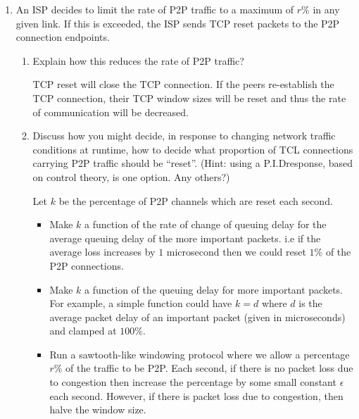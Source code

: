 \documentclass[10pt,\jkfside,a4paper]{article}
\begin{document}
\begin{enumerate}

    \item An ISP decides to limit the rate of P2P traffic to a maximum of $r\%$ in any given link. If this is exceeded, the ISP sends TCP reset packets to the P2P connection endpoints.

    \begin{enumerate}

        \item Explain how this reduces the rate of P2P traffic?

        TCP reset will close the TCP connection. If the peers re-establish the TCP connection, their TCP window sizes will be reset and thus the rate of communication will be decreased.

        \item Discuss how you might decide, in response to changing network traffic conditions at runtime, how to decide what proportion of TCL connections carrying P2P traffic should be ``reset''.
        (Hint: using a P.I.D\onedot response, based on control theory, is one option. Any others?)

        Let $k$ be the percentage of P2P channels which are reset each second.

        \begin{itemize}

            \item Make $k$ a function of the rate of change of queuing delay for the average queuing delay of the more important packets. i.e if the average loss increases by $1$ microsecond then we could reset
            $1\%$ of the P2P connections.

            \item Make $k$ a function of the queuing delay for more important packets. For example, a simple function could have $k = d$
            where $d$ is the average packet delay of an important packet (given in microseconds) and clamped at $100\%$.

            \item Run a sawtooth-like windowing protocol where we allow a percentage $r\%$ of the traffic to be P2P. Each second, if there is no packet loss due to congestion then increase the percentage by some
            small constant $\epsilon$ each second. However, if there is packet loss due to congestion, then halve the window size.

        \end{itemize}


\end{enumerate}
\end{enumerate}
\end{document}

